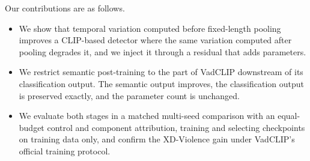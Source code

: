 Our contributions are as follows.
\begin{itemize}
  \item We show that temporal variation computed before fixed-length pooling improves a CLIP-based detector where the same variation computed after pooling degrades it, and we inject it through a residual that adds \pvrParams{} parameters.
  \item We restrict semantic post-training to the part of VadCLIP downstream of its classification output. The semantic output improves, the classification output is preserved exactly, and the parameter count is unchanged.
  \item We evaluate both stages in a matched multi-seed comparison with an equal-budget control and component attribution, training and selecting checkpoints on training data only, and confirm the XD-Violence gain under VadCLIP's official training protocol.
\end{itemize}
